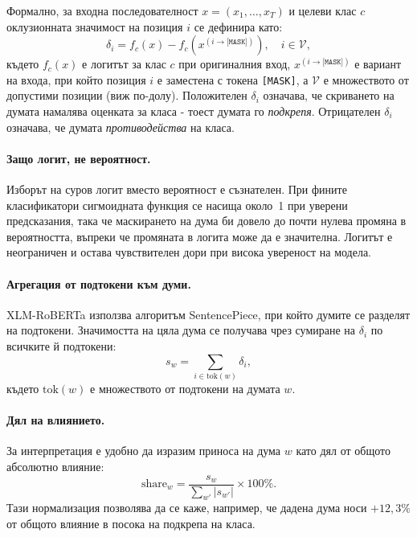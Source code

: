 \documentclass[12pt,a4paper]{report}
\begin{document}
Формално, за входна последователност $x = (x_1, \ldots, x_T)$ и целеви клас $c$ оклузионната значимост на позиция $i$ се дефинира като:
\begin{equation}
  \delta_i = f_c(x) - f_c\!\left(x^{(i \to \texttt{[MASK]})}\right), \quad i \in \mathcal{V},
  \label{eq:occlusion}
\end{equation}
където $f_c(x)$ е логитът за клас $c$ при оригиналния вход, $x^{(i \to \texttt{[MASK]})}$ е вариант на входа, при който позиция $i$ е заместена с токена \texttt{[MASK]}, а $\mathcal{V}$ е множеството от допустими позиции (виж по-долу). Положителен $\delta_i$ означава, че скриването на думата намалява оценката за класа - тоест думата го \emph{подкрепя}. Отрицателен $\delta_i$ означава, че думата \emph{противодейства} на класа.

\paragraph{Защо логит, не вероятност.} Изборът на суров логит вместо вероятност е съзнателен. При фините класификатори сигмоидната функция се насища около~1 при уверени предсказания, така че маскирането на дума би довело до почти нулева промяна в вероятността, въпреки че промяната в логита може да е значителна. Логитът е неограничен и остава чувствителен дори при висока увереност на модела.

\paragraph{Агрегация от подтокени към думи.} XLM-RoBERTa използва алгоритъм SentencePiece, при който думите се разделят на подтокени. Значимостта на цяла дума се получава чрез сумиране на $\delta_i$ по всичките й подтокени:
\begin{equation}
  s_w = \sum_{i \in \mathrm{tok}(w)} \delta_i,
  \label{eq:aggregation}
\end{equation}
където $\mathrm{tok}(w)$ е множеството от подтокени на думата $w$.

\paragraph{Дял на влиянието.} За интерпретация е удобно да изразим приноса на дума $w$ като дял от общото абсолютно влияние:
\begin{equation}
  \mathrm{share}_w = \frac{s_w}{\displaystyle\sum_{w'} |s_{w'}|} \times 100\%.
  \label{eq:share}
\end{equation}
Тази нормализация позволява да се каже, например, че дадена дума носи $+12{,}3\%$ от общото влияние в посока на подкрепа на класа.
\end{document}
